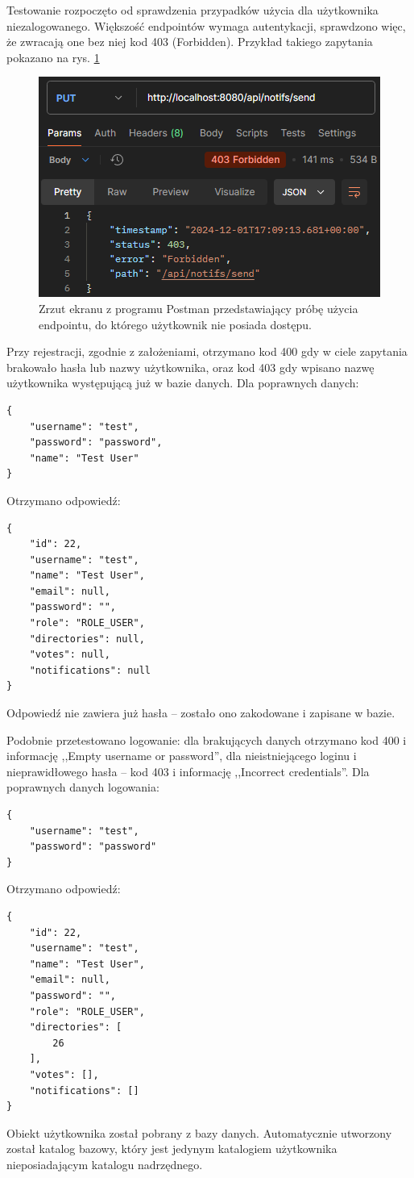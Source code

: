 \documentclass[a4paper,twoside,12pt]{book}
\begin{document}
Testowanie rozpoczęto od sprawdzenia przypadków użycia dla użytkownika niezalogowanego. Większość endpointów wymaga autentykacji, sprawdzono więc, że zwracają one bez niej kod 403 (Forbidden). Przykład takiego zapytania pokazano na rys. \ref{fig:send-notifs-403}

\begin{figure}
\centering
\includegraphics[width=\textwidth]{./SendNotifs403.png}
\caption{Zrzut ekranu z programu Postman przedstawiający próbę użycia endpointu, do którego użytkownik nie posiada dostępu.}
\label{fig:send-notifs-403}
\end{figure}

Przy rejestracji, zgodnie z założeniami, otrzymano kod 400 gdy w ciele zapytania brakowało hasła lub nazwy użytkownika, oraz kod 403 gdy wpisano nazwę użytkownika występującą już w bazie danych. Dla poprawnych danych:
\begin{verbatim}
{
	"username": "test",
	"password": "password",
	"name": "Test User"
}
\end{verbatim}
Otrzymano odpowiedź:
\begin{verbatim}
{
	"id": 22,
	"username": "test",
	"name": "Test User",
	"email": null,
	"password": "",
	"role": "ROLE_USER",
	"directories": null,
	"votes": null,
	"notifications": null
}
\end{verbatim}
Odpowiedź nie zawiera już hasła -- zostało ono zakodowane i zapisane w bazie.

Podobnie przetestowano logowanie: dla brakujących danych otrzymano kod 400 i informację ,,Empty username or password'', dla nieistniejącego loginu i nieprawidłowego hasła -- kod 403 i informację ,,Incorrect credentials''. Dla poprawnych danych logowania:
\begin{verbatim}
{
	"username": "test",
	"password": "password"
}
\end{verbatim}
Otrzymano odpowiedź:
\begin{verbatim}
{
	"id": 22,
	"username": "test",
	"name": "Test User",
	"email": null,
	"password": "",
	"role": "ROLE_USER",
	"directories": [
		26
	],
	"votes": [],
	"notifications": []
}
\end{verbatim}
Obiekt użytkownika został pobrany z bazy danych. Automatycznie utworzony został katalog bazowy, który jest jedynym katalogiem użytkownika nieposiadającym katalogu nadrzędnego.
\end{document}
